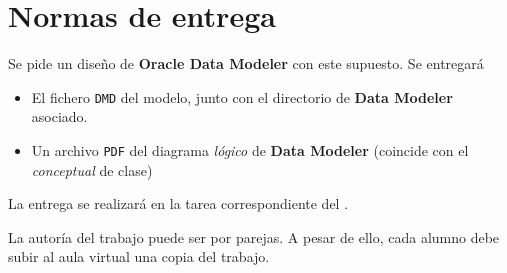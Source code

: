 \section{Normas de entrega}
Se pide un diseño de \textbf{Oracle Data Modeler} con este supuesto. Se entregará
\begin{itemize}
\item  El fichero \texttt{DMD} del modelo, junto con el directorio de \textbf{Data Modeler} asociado.
\item Un archivo \texttt{PDF} del diagrama \textit{lógico} de \textbf{Data Modeler} (coincide con el \textit{conceptual} de clase)
\end{itemize}

La entrega se realizará en la tarea correspondiente del .

La autoría del trabajo puede ser por parejas. A pesar de ello, cada alumno debe subir al aula virtual una copia del trabajo.



